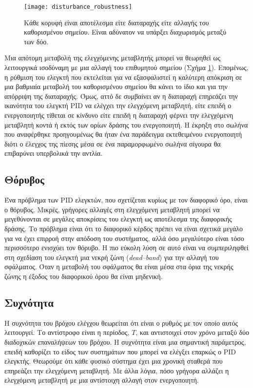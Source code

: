 \begin{figure}[h]
  \centering
  \texttt{[image: disturbance\_robustness]}
  \caption{Κάθε κορυφή είναι αποτέλεσμα είτε διαταραχής είτε αλλαγής του καθορισμένου σημείου. Είναι αδύνατον να υπάρξει διαχωρισμός μεταξύ των δύο.}
  \label{fig:disturbance_robustness}
\end{figure}

Μια απότομη μεταβολή της ελεγχόμενης μεταβλητής μπορεί να θεωρηθεί ως λειτουργικά ισοδύναμη με μια αλλαγή του επιθυμητού σημείου (Σχήμα \ref{fig:disturbance_robustness}). Επομένως, η ρύθμιση του ελεγκτή που εκτελείται για να εξασφαλιστεί η καλύτερη απόκριση σε μια βαθμιαία μεταβολή του καθορισμένου σημείου θα κάνει το ίδιο και για την απόρριψη της διαταραχής. Όμως, αττό δε συμβαίνει αν η διαταραχή επηρεάζει την ικανότητα του ελεγκτή PID να ελέγχει την ελεγχόμενη μεταβλητή, είτε επειδή ο ενεργοποιητής τίθεται σε κίνδυνο είτε επειδή η διαταραχή φέρνει την ελεγχόμενη μεταβλητή κοντά ή εκτός των ορίων δράσης του ενεργοποιητή. Η έκρηξη στο σωλήνα
που αναφέρθηκε προηγουμένως θα ήταν ένα παράδειγμα εκτεθειμένου ενεργοποιητή διότι ο έλεγχος της πίεσης μέσα σε ένα παραμορφωμένο σωλήνα σίγουρα θα επιβαρύνει υπερβολικά την αντλία.

\subsection{Θόρυβος}

Ένα πρόβλημα των PID ελεγκτών, που σχετίζεται κυρίως με τον διαφορικό όρο, είναι ο θόρυβος. Μικρές, γρήγορες αλλαγές στη ελεγχόμενη μεταβλητή μπορεί να μεγεθύνονται σε μεγάλες αποκρίσεις του ελεγκτή ως αποτέλεσμα της διαφορικής δράσης. Το πρόβλημα είναι ότι το διαφορικό κέρδος πρέπει να είναι σχετικά μεγάλο για να έχει επιρροή στην απόδοση του συστήματος, αλλά όσο μεγαλύτερο είναι τόσο περισσότερο ενισχύει τον θόρυβο. Η πιο εύκολη λύση σε αυτό είναι να συμπεριληφθεί στη σχεδίαση του ελεγκτή μια νεκρή ζώνη (\emph{dead--band}) για την αλλαγή του σφάλματος. Όταν η μεταβολή του σφάλματος θα είναι μέσα στα όρια της νεκρής ζώνης η έξοδος του διαφορικού όρου θα είναι μηδενική.

\subsection{Συχνότητα}

Η συχνότητα του βρόχου ελέγχου θεωρείται ότι είναι ο ρυθμός με τον οποίο αυτός λειτουργεί. Το αντίστροφο είναι η περίοδος, $T$, και αντιστοιχεί στον χρόνο μεταξύ δύο διαδοχικών επαναλήψεων του βρόχου. Η συχνότητα είναι μια σημαντική παράμετρος, επειδή καθορίζει το είδος των συστημάτων που μπορεί να ελέγξει επαρκώς ο PID ελεγκτής. Θεωρούμε ότι κάθε φυσικό σύστημα έχει μια χρονική σταθερά που επηρεάζει την ελεγχόμενη μεταβλητή. Με άλλα λόγια, πόσο γρήγορα αλλάζει η ελεγχόμενη μεταβλητή με μια αντίστοιχη αλλαγή στον ενεργοποιητή.

